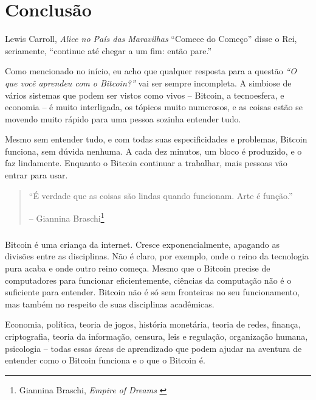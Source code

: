 \label{ch:conclusion}

\chapter*{Conclusão}

\begin{chapquote}{Lewis Carroll, \textit{Alice no País das Maravilhas}}
\enquote{Comece do Começo} disse o Rei, seriamente, \enquote{continue 
até chegar a um fim: então pare.}
\end{chapquote}
Como mencionado no início, eu acho que qualquer resposta para a questão 
\textit{“O que você aprendeu com o Bitcoin?”} vai ser sempre incompleta. 
A simbiose de vários sistemas que podem ser vistos como vivos -- Bitcoin, 
a tecnoesfera, e economia -- é muito interligada, os tópicos muito numerosos, e 
as coisas estão se movendo muito rápido para uma pessoa sozinha entender tudo.

Mesmo sem entender tudo, e com todas suas especificidades e problemas, Bitcoin 
funciona, sem dúvida nenhuma. A cada dez minutos, um bloco é produzido, 
e o faz lindamente. Enquanto o Bitcoin continuar a trabalhar, mais pessoas 
vão entrar para usar.

\begin{quotation}\begin{samepage}
\enquote{É verdade que as coisas são lindas quando funcionam. Arte é função.}
\begin{flushright} -- Giannina Braschi\footnote{Giannina Braschi, \textit{Empire of Dreams} \cite{braschi2011empire}}
\end{flushright}\end{samepage}\end{quotation}

\paragraph{} Bitcoin é uma criança da internet. Cresce exponencialmente, 
apagando as divisões entre as disciplinas. Não é claro, por exemplo, onde o 
reino da tecnologia pura acaba e onde outro reino começa. Mesmo que o Bitcoin 
precise de computadores para funcionar eficientemente, ciências da computação não 
é o suficiente para entender. Bitcoin não é só sem fronteiras no seu funcionamento, 
mas também no respeito de suas disciplinas acadêmicas.

Economia, política, teoria de jogos, história monetária, teoria de redes, finança, 
criptografia, teoria da informação, censura, leis e regulação, organização humana, 
psicologia -- todas essas áreas de aprendizado que podem ajudar na aventura de 
entender como o Bitcoin funciona e o que o Bitcoin é.

